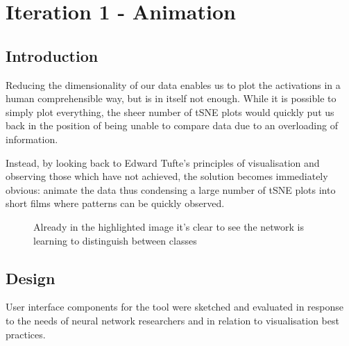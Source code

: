 \documentclass[a4paper,11pt,titlepage]{article}
\begin{document}
\section{Iteration 1 - Animation}
	\subsection{Introduction}
	Reducing the dimensionality of our data enables us to plot the activations in a human comprehensible way, but is in itself not enough. While it is possible to simply plot everything, the sheer number of tSNE plots would quickly put us back in the position of being unable to compare data due to an overloading of information. 
	\par 
	Instead, by looking back to Edward Tufte's principles of visualisation and observing those which have not achieved, the solution becomes immediately obvious: animate the data thus condensing a large number of tSNE plots into short films where patterns can be quickly observed.
	\par 
	
	\begin{figure}[H]
    			\caption{Already in the highlighted image it's clear to see the network is learning to distinguish between classes}%
	\end{figure}	

	
	\subsection{Design}
	User interface components for the tool were sketched and evaluated in response to the needs of neural network researchers and in relation to visualisation best practices. 
\end{document}
